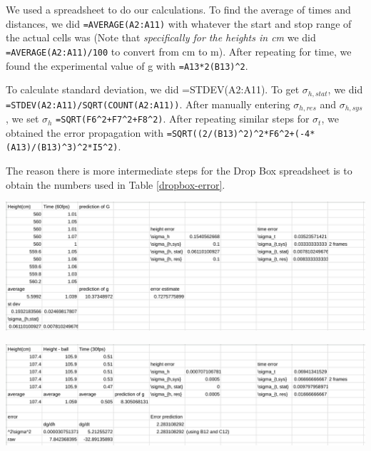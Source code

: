 \documentclass[12pt]{article}
\begin{document}
We used a spreadsheet to do our calculations. To find the average of times and distances, we did \texttt{=AVERAGE(A2:A11)} with whatever the start and stop range of the actual cells was (Note that \emph{specifically for the heights in cm} we did \texttt{=AVERAGE(A2:A11)/100} to convert from cm to m). After repeating for time, we found the experimental value of g with \texttt{=A13*2(B13)\textasciicircum{}2}.

To calculate standard deviation, we did =STDEV(A2:A11). To get \(\sigma_{h,stat}\), we did \texttt{=STDEV(A2:A11)/SQRT(COUNT(A2:A11))}. After manually entering \(\sigma_{h,res}\) and \(\sigma_{h,sys}\), we set \(\sigma_{h}\) \texttt{=SQRT(F6\textasciicircum{}2+F7\textasciicircum{}2+F8\textasciicircum{}2)}. After repeating similar steps for \(\sigma_t\), we obtained the error propagation with \texttt{=SQRT((2/(B13)\textasciicircum{}2)\textasciicircum{}2*F6\textasciicircum{}2+(-4*(A13)/(B13)\textasciicircum{}3)\textasciicircum{}2*I5\textasciicircum{}2)}.

The reason there is more intermediate steps for the Drop Box spreadsheet is to obtain the numbers used in Table \ref{dropbox-error}.

\begin{center}
\includegraphics[width=6in]{./tennisballspreadsheet.png}
\end{center}

\begin{center}
\includegraphics[width=6in]{./dropboxspreadsheet.png}
\end{center}
\end{document}
